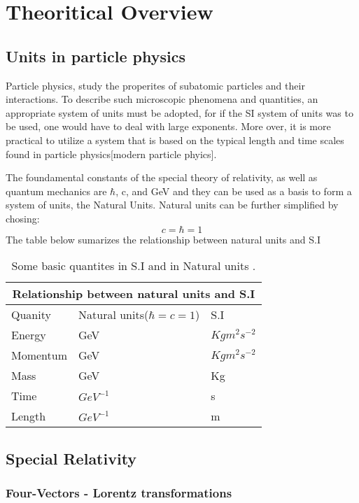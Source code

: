 
\section{Theoritical Overview}
\label{sec:org2ae82f1}
\subsection{Units in particle physics}
\label{sec:org2338bc0}
Particle physics, study the properites of subatomic particles and their interactions. To describe such microscopic phenomena and quantities, an appropriate system of units must be adopted, for if the SI system of units was to be used, one would have to deal with large exponents. More over, it is more practical to utilize a system that is based on the typical length and time scales found in particle physics[modern particle phyics].

The foundamental constants of the special theory of relativity, as well as quantum mechanics are \(\hbar\), c, and  GeV and they can be used as a basis to form a system of units, the Natural Units. Natural units can be further simplified by chosing:
\[ c = \hbar = 1\]
The table below sumarizes the relationship between natural units and S.I

\begin{table}[h!]
\centering
\begin{tabular}{ |p{3cm}|p{4cm}|p{3cm}|  }
 \hline
 \multicolumn{3}{|c|}{Relationship between natural units and S.I} \\
 \hline
 \hline
Quanity & Natural units($ \hbar = c = 1 $) & S.I \\
 \hline
Energy & GeV & $Kg m^{2}s^{-2}$ \\
Momentum & GeV& $ Kg m^{2}s^{-2}$ \\
Mass & GeV & Kg\\
Time & $GeV^{-1}$ & s\\
Length & $GeV^{-1}$ & m\\
 \hline
\end{tabular}
\caption{Some basic quantites in S.I and in Natural units .}
\label{table:natural_units}
\end{table}

\subsection{Special Relativity}
\label{sec:orgd8ae263}

\subsubsection{Four-Vectors - Lorentz transformations}
\label{sec:orgec107fd}


